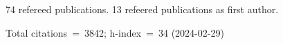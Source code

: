 74 refereed publications. 13 refeered publications as first author.

Total citations~=~3842; h-index~=~34 (2024-02-29)